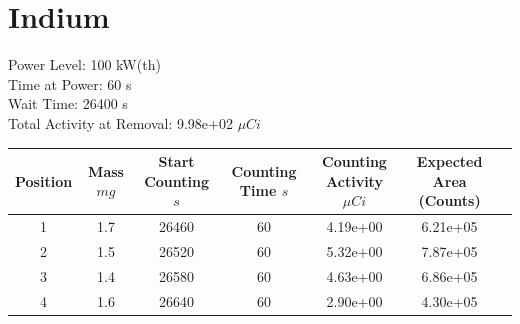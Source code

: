 \newpage

\section*{ Indium }

Power Level: 100 kW(th) \\
Time at Power: 60 s \\
Wait Time: 26400 s \\
Total Activity at Removal: 9.98e+02 $\mu Ci$

\begin{table}[h]
\centering
\begin{tabular}{ |c|c|c|c|c|c|c| }
 \hline
 Position & Mass $mg$ & Start Counting $s$ & Counting Time $s$ & Counting Activity $\mu Ci$ & Expected Area (Counts) \\
 \hline 
 1 & 1.7 & 26460 & 60 & 4.19e+00 & 6.21e+05\\ 
\hline
 2 & 1.5 & 26520 & 60 & 5.32e+00 & 7.87e+05\\ 
\hline
 3 & 1.4 & 26580 & 60 & 4.63e+00 & 6.86e+05\\ 
\hline
 4 & 1.6 & 26640 & 60 & 2.90e+00 & 4.30e+05\\ 
\hline
\end{tabular}
\end{table}

\begin{figure}[!ht]
   \centering
   \quad
   \\ 
   \quad 

\end{figure}

